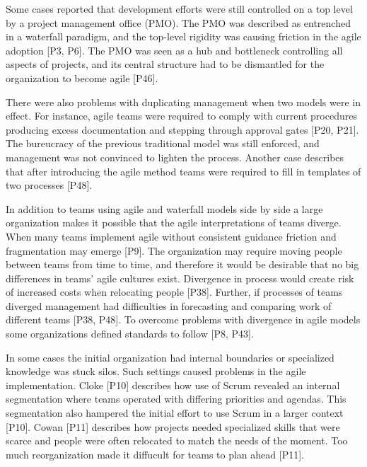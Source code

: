 \documentclass[preprint,authoryear,12pt]{elsarticle}
\begin{document}
Some cases reported that development efforts were still controlled on a top
level by a project management office (PMO). The PMO was described as entrenched
in a waterfall paradigm, and the top-level rigidity was causing friction in the
agile adoption [P3, P6]. The PMO was seen as a hub and bottleneck controlling
all aspects of projects, and its central structure had to be dismantled for the
organization to become agile [P46].

There were also problems with duplicating management when two models were in
effect. For instance, agile teams were required to comply with current
procedures producing excess documentation and stepping through approval gates
[P20, P21]. The bureucracy of the previous traditional model was still enforced,
and management was not convinced to lighten the process. Another case describes
that after introducing the agile method teams were required to fill in templates
of two processes [P48].


In addition to teams using agile and waterfall models side by side a large
organization makes it possible that the agile interpretations of teams diverge.
When many teams implement agile without consistent guidance friction and
fragmentation may emerge [P9]. The organization may require moving people
between teams from time to time, and therefore it would be desirable that no big
differences in teams' agile cultures exist. Divergence in process would create
risk of increased costs when relocating people [P38].
Further, if processes of teams diverged management had difficulties in
forecasting and comparing work of different teams [P38, P48]. To overcome
problems with divergence in agile models some organizations defined standards to
follow [P8, P43].

In some cases the initial organization had internal boundaries or specialized
knowledge was stuck silos. Such settings caused problems in the agile
implementation.
Cloke [P10] describes how use of Scrum revealed an internal segmentation where
teams operated with differing priorities and agendas. This segmentation also
hampered the initial effort to use Scrum in a larger context [P10].
Cowan [P11] describes how projects needed specialized skills that were scarce
and people were often relocated to match the needs of the moment. Too much
reorganization made it diffucult for teams to plan ahead [P11].
\end{document}
